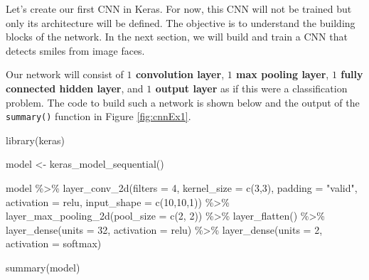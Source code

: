 \documentclass[
  11pt,
]{krantz}
\newenvironment{Shaded}{\begin{snugshade}}{\end{snugshade}}
\newcommand{\AttributeTok}[1]{\textcolor[rgb]{0.61,0.61,0.61}{#1}}
\newcommand{\DecValTok}[1]{\textcolor[rgb]{0.06,0.06,0.06}{#1}}
\newcommand{\FunctionTok}[1]{\textcolor[rgb]{0,0,0}{#1}}
\newcommand{\NormalTok}[1]{#1}
\newcommand{\OtherTok}[1]{\textcolor[rgb]{0.37,0.37,0.37}{#1}}
\newcommand{\SpecialCharTok}[1]{\textcolor[rgb]{0,0,0}{#1}}
\newcommand{\StringTok}[1]{\textcolor[rgb]{0.5,0.5,0.5}{#1}}
\begin{document}
Let's create our first CNN in Keras. For now, this CNN will not be trained but only its architecture will be defined. The objective is to understand the building blocks of the network. In the next section, we will build and train a CNN that detects smiles from image faces.

Our network will consist of \textbf{\(1\) convolution layer}, \textbf{\(1\) max pooling layer}, \textbf{\(1\) fully connected hidden layer}, and \textbf{\(1\) output layer} as if this were a classification problem. The code to build such a network is shown below and the output of the \texttt{summary()} function in Figure \ref{fig:cnnEx1}.

\begin{Shaded}
\begin{Highlighting}[]
\FunctionTok{library}\NormalTok{(keras)}

\NormalTok{model }\OtherTok{\textless{}{-}} \FunctionTok{keras\_model\_sequential}\NormalTok{()}

\NormalTok{model }\SpecialCharTok{\%\textgreater{}\%}
  \FunctionTok{layer\_conv\_2d}\NormalTok{(}\AttributeTok{filters =} \DecValTok{4}\NormalTok{,}
                \AttributeTok{kernel\_size =} \FunctionTok{c}\NormalTok{(}\DecValTok{3}\NormalTok{,}\DecValTok{3}\NormalTok{),}
                \AttributeTok{padding =} \StringTok{"valid"}\NormalTok{,}
                \AttributeTok{activation =} \StringTok{\textquotesingle{}relu\textquotesingle{}}\NormalTok{,}
                \AttributeTok{input\_shape =} \FunctionTok{c}\NormalTok{(}\DecValTok{10}\NormalTok{,}\DecValTok{10}\NormalTok{,}\DecValTok{1}\NormalTok{)) }\SpecialCharTok{\%\textgreater{}\%}
  \FunctionTok{layer\_max\_pooling\_2d}\NormalTok{(}\AttributeTok{pool\_size =} \FunctionTok{c}\NormalTok{(}\DecValTok{2}\NormalTok{, }\DecValTok{2}\NormalTok{)) }\SpecialCharTok{\%\textgreater{}\%}
  \FunctionTok{layer\_flatten}\NormalTok{() }\SpecialCharTok{\%\textgreater{}\%}
  \FunctionTok{layer\_dense}\NormalTok{(}\AttributeTok{units =} \DecValTok{32}\NormalTok{, }\AttributeTok{activation =} \StringTok{\textquotesingle{}relu\textquotesingle{}}\NormalTok{) }\SpecialCharTok{\%\textgreater{}\%}
  \FunctionTok{layer\_dense}\NormalTok{(}\AttributeTok{units =} \DecValTok{2}\NormalTok{, }\AttributeTok{activation =} \StringTok{\textquotesingle{}softmax\textquotesingle{}}\NormalTok{)}

\FunctionTok{summary}\NormalTok{(model)}
\end{Highlighting}
\end{Shaded}
\end{document}

